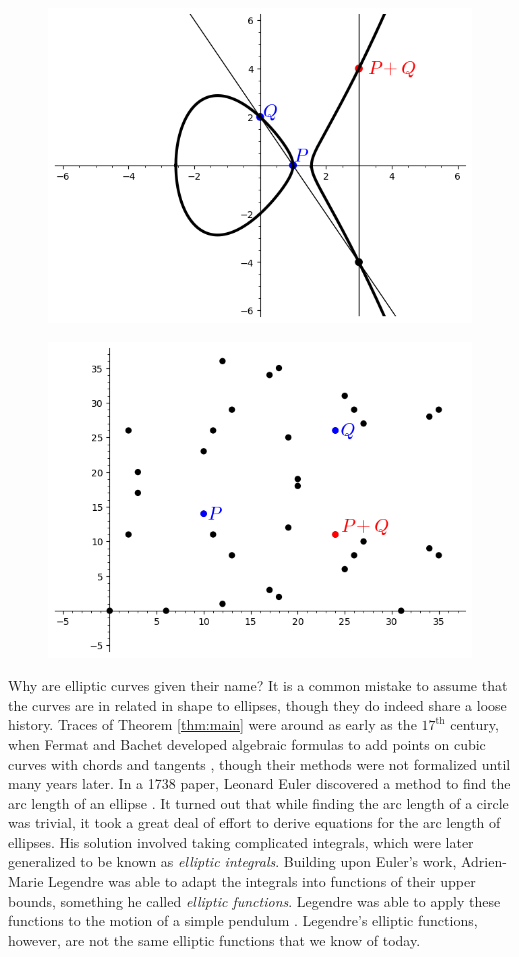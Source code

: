 \documentclass[]{../../math_paper}
\begin{document}
\begin{figure}[H]
    \centering
    \begin{minipage}{.5\textwidth}
        \centering
        \includegraphics[height = 2 in]{media/curve_1.png}
        \label{fig:curve1}
    \end{minipage}%
    \begin{minipage}{.5\textwidth}
        \centering
        \includegraphics[height = 2 in]{media/curve_2.png}
        \label{fig:curve2}
    \end{minipage}
\end{figure}

Why are elliptic curves given their name? It is a common mistake to assume that the curves are in related in shape to ellipses, though they do indeed share a loose history. Traces of Theorem \ref{thm:main} were around as early as the $17^{\text{th}}$ century, when Fermat and Bachet developed algebraic formulas to add points on cubic curves with chords and tangents \cite{rice}, though their methods were not formalized until many years later. In a 1738 paper, Leonard Euler discovered a method to find the arc length of an ellipse \cite{sandifer2007euler}. It turned out that while finding the arc length of a circle was trivial, it took a great deal of effort to derive equations for the arc length of ellipses. His solution involved taking complicated integrals, which were later generalized to be known as \emph{elliptic integrals}. Building upon Euler's work, Adrien-Marie Legendre was able to adapt   the integrals into functions of their upper bounds, something he called \emph{elliptic functions}. Legendre was able to apply these functions to the motion of a simple pendulum \cite{legendre}. Legendre's elliptic functions, however, are not the same elliptic functions that we know of today.
\end{document}
